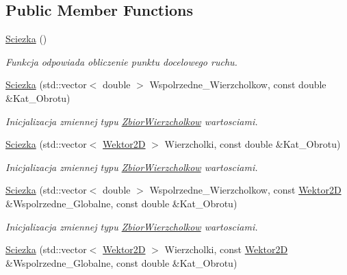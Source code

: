 \subsection*{Public Member Functions}
\begin{DoxyCompactItemize}
\item 
\hypertarget{class_sciezka_a95e9a0c51da72e4bd4edcca9f9ea7de4}{\hyperlink{class_sciezka_a95e9a0c51da72e4bd4edcca9f9ea7de4}{Sciezka} ()}\label{class_sciezka_a95e9a0c51da72e4bd4edcca9f9ea7de4}

\begin{DoxyCompactList}\small\item\em Funkcja odpowiada obliczenie punktu docelowego ruchu. \end{DoxyCompactList}\item 
\hyperlink{class_sciezka_af2ddf0d4ffdadcbc77933e19697190b0}{Sciezka} (std\+::vector$<$ double $>$ Wspolrzedne\+\_\+\+Wierzcholkow, const double \&Kat\+\_\+\+Obrotu)
\begin{DoxyCompactList}\small\item\em Inicjalizacja zmiennej typu \hyperlink{class_zbior_wierzcholkow}{Zbior\+Wierzcholkow} wartosciami. \end{DoxyCompactList}\item 
\hyperlink{class_sciezka_a64346e0dc48c596c3d89941cac8e7fe4}{Sciezka} (std\+::vector$<$ \hyperlink{class_wektor2_d}{Wektor2\+D} $>$ Wierzcholki, const double \&Kat\+\_\+\+Obrotu)
\begin{DoxyCompactList}\small\item\em Inicjalizacja zmiennej typu \hyperlink{class_zbior_wierzcholkow}{Zbior\+Wierzcholkow} wartosciami. \end{DoxyCompactList}\item 
\hyperlink{class_sciezka_a61da1d068b1b4cf437959dd4ec4f31b2}{Sciezka} (std\+::vector$<$ double $>$ Wspolrzedne\+\_\+\+Wierzcholkow, const \hyperlink{class_wektor2_d}{Wektor2\+D} \&Wspolrzedne\+\_\+\+Globalne, const double \&Kat\+\_\+\+Obrotu)
\begin{DoxyCompactList}\small\item\em Inicjalizacja zmiennej typu \hyperlink{class_zbior_wierzcholkow}{Zbior\+Wierzcholkow} wartosciami. \end{DoxyCompactList}\item 
\hyperlink{class_sciezka_ad33404b8f457cbd792fe746e639a0401}{Sciezka} (std\+::vector$<$ \hyperlink{class_wektor2_d}{Wektor2\+D} $>$ Wierzcholki, const \hyperlink{class_wektor2_d}{Wektor2\+D} \&Wspolrzedne\+\_\+\+Globalne, const double \&Kat\+\_\+\+Obrotu)

\end{DoxyCompactItemize}
